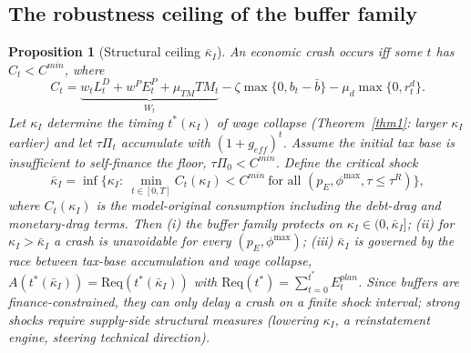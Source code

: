 \documentclass[review,12pt]{elsarticle}
\theoremstyle{plain}
\newtheorem{proposition}[theorem]{Proposition}
\theoremstyle{definition}
\theoremstyle{remark}
\begin{document}
\subsection{The robustness ceiling of the buffer family}
\begin{proposition}[Structural ceiling $\bar\kappa_I$]
\label{prop6}
An economic crash occurs iff some $t$ has $C_t<C^{min}$, where
\[
C_t=\underbrace{w_tL_t^D+w^P E_t^P+\mu_{TM}TM_t}_{W_t}-\zeta\max\{0,b_t-\bar b\}-\mu_d\max\{0,r_t^d\}.
\]
Let $\kappa_I$ determine the timing $t^*(\kappa_I)$ of wage collapse (Theorem~\ref{thm1}: larger $\kappa_I$ earlier) and let $\tau\Pi_t$ accumulate with $(1+g_{eff})^t$. Assume the initial tax base is insufficient to self-finance the floor, $\tau\Pi_0<C^{min}$. Define the critical shock
\[
\bar\kappa_I=\inf\Big\{\kappa_I:\ \min_{t\in[0,T]} C_t(\kappa_I)<C^{min}\ \text{for all }(p_E,\phi^{\max},\tau\le\tau^R)\Big\},
\]
where $C_t(\kappa_I)$ is the model-original consumption including the debt-drag and monetary-drag terms. Then (i) the buffer family protects on $\kappa_I\in(0,\bar\kappa_I]$; (ii) for $\kappa_I>\bar\kappa_I$ a crash is unavoidable for \emph{every} $(p_E,\phi^{\max})$; (iii) $\bar\kappa_I$ is governed by the race between tax-base accumulation and wage collapse, $A(t^*(\bar\kappa_I))=\mathrm{Req}(t^*(\bar\kappa_I))$ with $\mathrm{Req}(t^*)=\sum_{t=0}^{t^*}E_t^{plan}$. Since buffers are finance-constrained, they can only delay a crash on a finite shock interval; strong shocks require supply-side structural measures (lowering $\kappa_I$, a reinstatement engine, steering technical direction).
\end{proposition}
\end{document}
